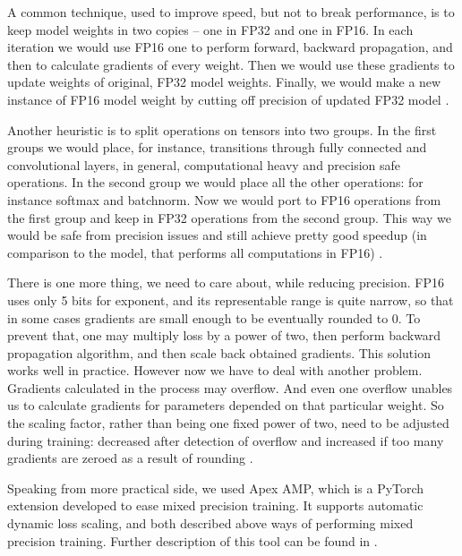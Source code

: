 \documentclass[licencjacka,en]{pracamgr}
\begin{document}
	A common technique, used to improve speed, but not to break performance, is to keep model weights in two copies -- one in FP32 and one in FP16. In each iteration we would use FP16 one to perform forward, backward propagation, and then to calculate gradients of every weight. Then we would use these gradients to update weights of original, FP32 model weights. Finally, we would make a new instance of FP16 model weight by cutting off precision of updated FP32 model \cite{APEX}.
	
	Another heuristic is to split operations on tensors into two groups. In the first groups we would place, for instance, transitions through fully connected and convolutional layers, in general, computational heavy and precision safe operations. In the second group we would place all the other operations: for instance softmax and batchnorm. Now we would port to FP16 operations from the first group and keep in FP32 operations from the second group. This way we would be safe from precision issues and still achieve pretty good speedup (in comparison to the model, that performs all computations in FP16) \cite{APEX}.
	
	There is one more thing, we need to care about, while reducing precision. FP16 uses only 5 bits for exponent, and its representable range is quite narrow, so that in some cases gradients are small enough to be eventually rounded to 0. To prevent that, one may multiply loss by a power of two, then perform backward propagation algorithm, and then scale back obtained gradients. This solution works well in practice. However now we have to deal with another problem. Gradients calculated in the process may overflow. And even one overflow unables us to calculate gradients for parameters depended on that particular weight. So the scaling factor, rather than being one fixed power of two, need to be adjusted during training: decreased after detection of overflow and increased if too many gradients are zeroed as a result of rounding \cite{LOSS_SCALING}.
	
	Speaking from more practical side, we used Apex AMP, which is a PyTorch extension developed to ease mixed precision training. It supports automatic dynamic loss scaling, and both described above ways of performing mixed precision training. Further description of this tool can be found in \cite{APEX_DOCS}.
	
\end{document}
